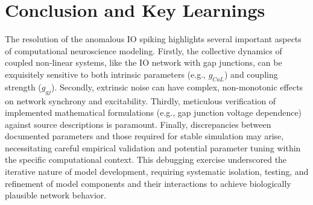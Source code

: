 \documentclass{article}
\begin{document}
\section*{Conclusion and Key Learnings}
The resolution of the anomalous IO spiking highlights several important aspects of computational neuroscience modeling. Firstly, the collective dynamics of coupled non-linear systems, like the IO network with gap junctions, can be exquisitely sensitive to both intrinsic parameters (e.g., $g_{CaL}$) and coupling strength ($g_{gj}$). Secondly, extrinsic noise can have complex, non-monotonic effects on network synchrony and excitability. Thirdly, meticulous verification of implemented mathematical formulations (e.g., gap junction voltage dependence) against source descriptions is paramount. Finally, discrepancies between documented parameters and those required for stable simulation may arise, necessitating careful empirical validation and potential parameter tuning within the specific computational context. This debugging exercise underscored the iterative nature of model development, requiring systematic isolation, testing, and refinement of model components and their interactions to achieve biologically plausible network behavior.
\end{document}
